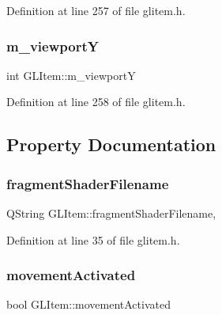 Definition at line 257 of file glitem.\+h.

\mbox{\label{class_g_l_item_ae80eb4ae45d65460db5535598b54a873}} 
\subsubsection{\texorpdfstring{m\_viewportY}{m\_viewportY}}
{\footnotesize\ttfamily int G\+L\+Item\+::m\+\_\+viewportY\hspace{0.3cm}{\ttfamily [protected]}}



Definition at line 258 of file glitem.\+h.



\subsection{Property Documentation}
\mbox{\label{class_g_l_item_a81e33a49ac37afcc322c703b55cd6071}} 
\subsubsection{\texorpdfstring{fragmentShaderFilename}{fragmentShaderFilename}}
{\footnotesize\ttfamily Q\+String G\+L\+Item\+::fragment\+Shader\+Filename\hspace{0.3cm}{\ttfamily [read]}, {\ttfamily [write]}}



Definition at line 35 of file glitem.\+h.

\mbox{\label{class_g_l_item_aad3da5ba5d67c4f44430e6ed3b2cc8bc}} 
\subsubsection{\texorpdfstring{movementActivated}{movementActivated}}
{\footnotesize\ttfamily bool G\+L\+Item\+::movement\+Activated\hspace{0.3cm}{\ttfamily [read]}}



